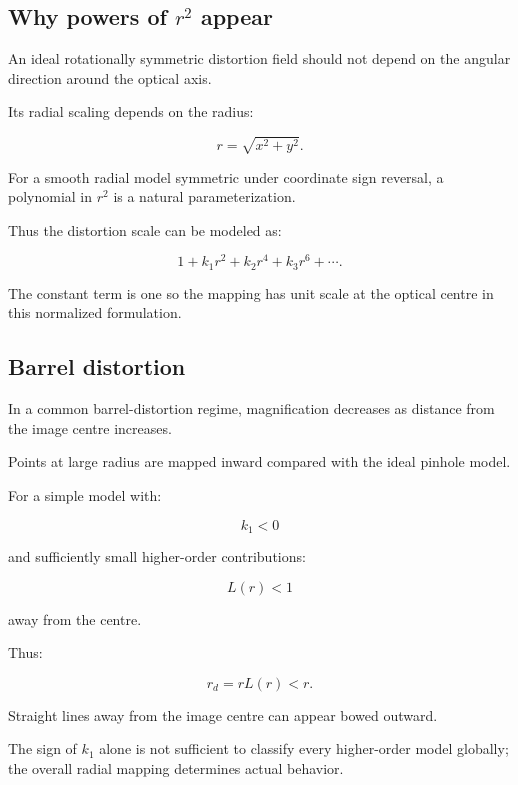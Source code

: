 \subsection{\texorpdfstring{Why powers of \(r^2\) appear}{Why powers of r\^{}2 appear}}\label{02-foundations-ii-ch035-why-powers-of-r2-appear}

\hypertarget{02-foundations-ii-ch035-why-powers-of-r2-appear}{}

An ideal rotationally symmetric distortion field should not depend on the angular direction around the optical axis.

Its radial scaling depends on the radius:

\[
 r=\sqrt{x^2+y^2}.
\]

For a smooth radial model symmetric under coordinate sign reversal, a polynomial in \(r^2\) is a natural parameterization.

Thus the distortion scale can be modeled as:

\[
 1+k_1r^2+k_2r^4+k_3r^6+\cdots.
\]

The constant term is one so the mapping has unit scale at the optical centre in this normalized formulation.

\subsection{Barrel distortion}\label{02-foundations-ii-ch035-barrel-distortion}

\hypertarget{02-foundations-ii-ch035-barrel-distortion}{}

In a common barrel-distortion regime, magnification decreases as distance from the image centre increases.

Points at large radius are mapped inward compared with the ideal pinhole model.

For a simple model with:

\[
 k_1<0
\]

and sufficiently small higher-order contributions:

\[
 L(r)<1
\]

away from the centre.

Thus:

\[
 r_d=rL(r)<r.
\]

Straight lines away from the image centre can appear bowed outward.

The sign of \(k_1\) alone is not sufficient to classify every higher-order model globally; the overall radial mapping determines actual behavior.

